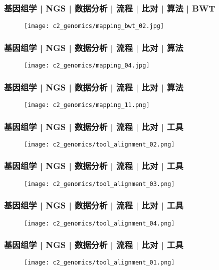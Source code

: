 \begin{frame}
  \frametitle{基因组学 | NGS | 数据分析 | 流程 | 比对 | 算法 | BWT}
  \begin{figure}
    \centering
    \texttt{[image: c2\_genomics/mapping\_bwt\_02.jpg]}
  \end{figure}
\end{frame}

\begin{frame}
  \frametitle{基因组学 | NGS | 数据分析 | 流程 | 比对 | 算法}
  \begin{figure}
    \centering
    \texttt{[image: c2\_genomics/mapping\_04.jpg]}
  \end{figure}
\end{frame}

\begin{frame}
  \frametitle{基因组学 | NGS | 数据分析 | 流程 | 比对 | 算法}
  \begin{figure}
    \centering
    \texttt{[image: c2\_genomics/mapping\_11.png]}
  \end{figure}
\end{frame}

\begin{frame}
  \frametitle{基因组学 | NGS | 数据分析 | 流程 | 比对 | 工具}
  \begin{figure}
    \centering
    \texttt{[image: c2\_genomics/tool\_alignment\_02.png]}
  \end{figure}
\end{frame}

\begin{frame}
  \frametitle{基因组学 | NGS | 数据分析 | 流程 | 比对 | 工具}
  \begin{figure}
    \centering
    \texttt{[image: c2\_genomics/tool\_alignment\_03.png]}
  \end{figure}
\end{frame}

\begin{frame}
  \frametitle{基因组学 | NGS | 数据分析 | 流程 | 比对 | 工具}
  \begin{figure}
    \centering
    \texttt{[image: c2\_genomics/tool\_alignment\_04.png]}
  \end{figure}
\end{frame}

\begin{frame}
  \frametitle{基因组学 | NGS | 数据分析 | 流程 | 比对 | 工具}
  \begin{figure}
    \centering
    \texttt{[image: c2\_genomics/tool\_alignment\_01.png]}
  \end{figure}
\end{frame}


